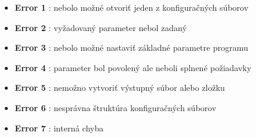 \begin{itemize}
    \item \textbf{Error 1} : nebolo možné otvoriť jeden z konfiguračných súborov
    \item \textbf{Error 2} : vyžadovaný parameter nebol zadaný
    \item \textbf{Error 3} : nebolo možné nastaviť základné parametre programu
    \item \textbf{Error 4} : parameter bol povolený ale neboli splnené požiadavky
    \item \textbf{Error 5} : nemožno vytvoriť výstupný súbor alebo zložku
    \item \textbf{Error 6} : nesprávna štruktúra konfiguračných súborov
    \item \textbf{Error 7} : interná chyba
\end{itemize}
